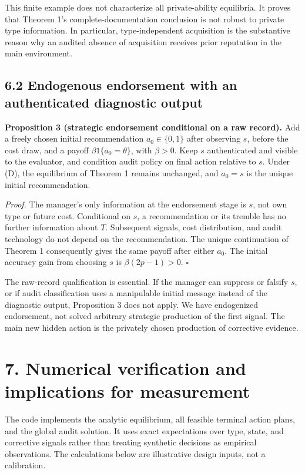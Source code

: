 \documentclass[
  11pt,
]{article}
\begin{document}
This finite example does not characterize all private-ability
equilibria. It proves that Theorem 1's complete-documentation conclusion
is not robust to private type information. In particular,
type-independent acquisition is the substantive reason why an audited
absence of acquisition receives prior reputation in the main
environment.

\subsection{6.2 Endogenous endorsement with an authenticated diagnostic
output}\label{endogenous-endorsement-with-an-authenticated-diagnostic-output}

\textbf{Proposition 3 (strategic endorsement conditional on a raw
record).} Add a freely chosen initial recommendation \(a_0\in\{0,1\}\)
after observing \(s\), before the cost draw, and a payoff
\(\beta1\{a_0=\theta\}\), with \(\beta>0\). Keep \(s\) authenticated and
visible to the evaluator, and condition audit policy on final action
relative to \(s\). Under (D), the equilibrium of Theorem 1 remains
unchanged, and \(a_0=s\) is the unique initial recommendation.

\emph{Proof.} The manager's only information at the endorsement stage is
\(s\), not own type or future cost. Conditional on \(s\), a
recommendation or its tremble has no further information about \(T\).
Subsequent signals, cost distribution, and audit technology do not
depend on the recommendation. The unique continuation of Theorem 1
consequently gives the same payoff after either \(a_0\). The initial
accuracy gain from choosing \(s\) is \(\beta(2p-1)>0\). \(\square\)

The raw-record qualification is essential. If the manager can suppress
or falsify \(s\), or if audit classification uses a manipulable initial
message instead of the diagnostic output, Proposition 3 does not apply.
We have endogenized endorsement, not solved arbitrary strategic
production of the first signal. The main new hidden action is the
privately chosen production of corrective evidence.

\section{7. Numerical verification and implications for
measurement}\label{numerical-verification-and-implications-for-measurement}

The code implements the analytic equilibrium, all feasible terminal
action plans, and the global audit solution. It uses exact expectations
over type, state, and corrective signals rather than treating synthetic
decisions as empirical observations. The calculations below are
illustrative design inputs, not a calibration.
\end{document}
